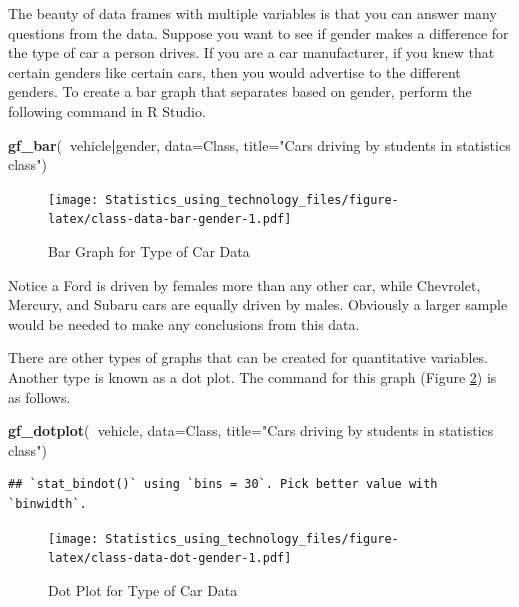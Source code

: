 \documentclass[
]{book}
\newenvironment{Shaded}{\begin{snugshade}}{\end{snugshade}}
\newcommand{\DataTypeTok}[1]{\textcolor[rgb]{0.13,0.29,0.53}{#1}}
\newcommand{\KeywordTok}[1]{\textcolor[rgb]{0.13,0.29,0.53}{\textbf{#1}}}
\newcommand{\NormalTok}[1]{#1}
\newcommand{\OperatorTok}[1]{\textcolor[rgb]{0.81,0.36,0.00}{\textbf{#1}}}
\newcommand{\StringTok}[1]{\textcolor[rgb]{0.31,0.60,0.02}{#1}}
\begin{document}
The beauty of data frames with multiple variables is that you can answer many questions from the data. Suppose you want to see if gender makes a difference for the type of car a person drives. If you are a car manufacturer, if you knew that certain genders like certain cars, then you would advertise to the different genders. To create a bar graph that separates based on gender, perform the following command in R Studio.



\begin{Shaded}
\begin{Highlighting}[]
\KeywordTok{gf_bar}\NormalTok{(}\OperatorTok{~}\NormalTok{vehicle}\OperatorTok{|}\NormalTok{gender, }\DataTypeTok{data=}\NormalTok{Class, }\DataTypeTok{title=}\StringTok{"Cars driving by students in statistics class"}\NormalTok{)}
\end{Highlighting}
\end{Shaded}

\begin{figure}
\centering
\texttt{[image: Statistics\_using\_technology\_files/figure-latex/class-data-bar-gender-1.pdf]}
\caption{\label{fig:class-data-bar-gender}Bar Graph for Type of Car Data}
\end{figure}

Notice a Ford is driven by females more than any other car, while Chevrolet, Mercury, and Subaru cars are equally driven by males. Obviously a larger sample would be needed to make any conclusions from this data.

There are other types of graphs that can be created for quantitative variables. Another type is known as a dot plot. The command for this graph (Figure \ref{fig:class-data-dot-gender}) is as follows.



\begin{Shaded}
\begin{Highlighting}[]
\KeywordTok{gf_dotplot}\NormalTok{(}\OperatorTok{~}\NormalTok{vehicle, }\DataTypeTok{data=}\NormalTok{Class, }\DataTypeTok{title=}\StringTok{"Cars driving by students in statistics class"}\NormalTok{)}
\end{Highlighting}
\end{Shaded}

\begin{verbatim}
## `stat_bindot()` using `bins = 30`. Pick better value with `binwidth`.
\end{verbatim}

\begin{figure}
\centering
\texttt{[image: Statistics\_using\_technology\_files/figure-latex/class-data-dot-gender-1.pdf]}
\caption{\label{fig:class-data-dot-gender}Dot Plot for Type of Car Data}
\end{figure}
\end{document}
